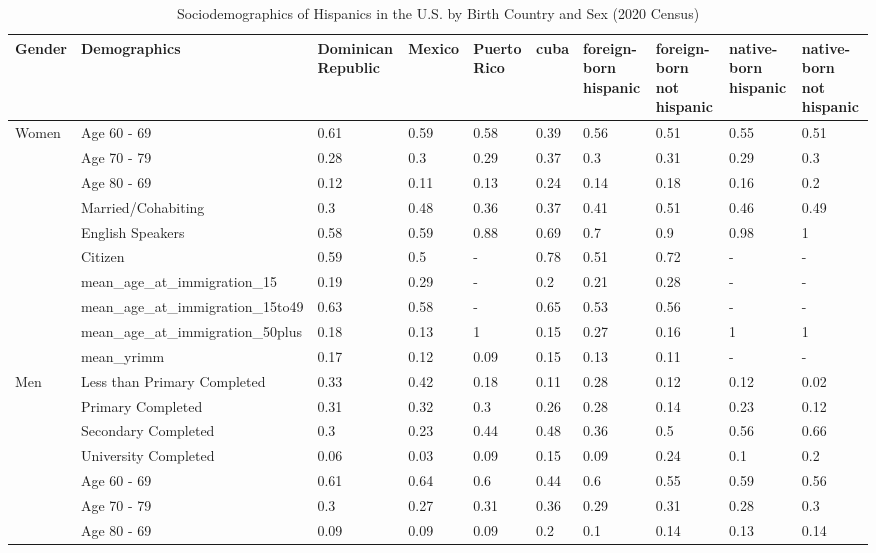 \begin{table}[ht]
\centering
\caption{Sociodemographics of Hispanics in the U.S. by Birth Country and Sex (2020 Census)} 
\begingroup\small
\begin{tabular}{l|l|llllllll}
  \hline
Gender & Demographics & Dominican Republic & Mexico & Puerto Rico & cuba & foreign-born hispanic & foreign-born not hispanic & native-born hispanic & native-born not hispanic \\ 
  \hline
Women & Age 60 - 69 & 0.61 & 0.59 & 0.58 & 0.39 & 0.56 & 0.51 & 0.55 & 0.51 \\ 
   & Age 70 - 79 & 0.28 & 0.3 & 0.29 & 0.37 & 0.3 & 0.31 & 0.29 & 0.3 \\ 
   & Age 80 - 69 & 0.12 & 0.11 & 0.13 & 0.24 & 0.14 & 0.18 & 0.16 & 0.2 \\ 
   & Married/Cohabiting & 0.3 & 0.48 & 0.36 & 0.37 & 0.41 & 0.51 & 0.46 & 0.49 \\ 
   & English Speakers & 0.58 & 0.59 & 0.88 & 0.69 & 0.7 & 0.9 & 0.98 & 1 \\ 
   & Citizen & 0.59 & 0.5 & - & 0.78 & 0.51 & 0.72 & - & - \\ 
   & mean\_age\_at\_immigration\_15 & 0.19 & 0.29 & - & 0.2 & 0.21 & 0.28 & - & - \\ 
   & mean\_age\_at\_immigration\_15to49 & 0.63 & 0.58 & - & 0.65 & 0.53 & 0.56 & - & - \\ 
   & mean\_age\_at\_immigration\_50plus & 0.18 & 0.13 & 1 & 0.15 & 0.27 & 0.16 & 1 & 1 \\ 
   & mean\_yrimm & 0.17 & 0.12 & 0.09 & 0.15 & 0.13 & 0.11 & - & - \\ 
  Men & Less than Primary Completed & 0.33 & 0.42 & 0.18 & 0.11 & 0.28 & 0.12 & 0.12 & 0.02 \\ 
   & Primary Completed & 0.31 & 0.32 & 0.3 & 0.26 & 0.28 & 0.14 & 0.23 & 0.12 \\ 
   & Secondary Completed & 0.3 & 0.23 & 0.44 & 0.48 & 0.36 & 0.5 & 0.56 & 0.66 \\ 
   & University Completed & 0.06 & 0.03 & 0.09 & 0.15 & 0.09 & 0.24 & 0.1 & 0.2 \\ 
   & Age 60 - 69 & 0.61 & 0.64 & 0.6 & 0.44 & 0.6 & 0.55 & 0.59 & 0.56 \\ 
   & Age 70 - 79 & 0.3 & 0.27 & 0.31 & 0.36 & 0.29 & 0.31 & 0.28 & 0.3 \\ 
   & Age 80 - 69 & 0.09 & 0.09 & 0.09 & 0.2 & 0.1 & 0.14 & 0.13 & 0.14 \\ 

\end{tabular}
\end{table}
